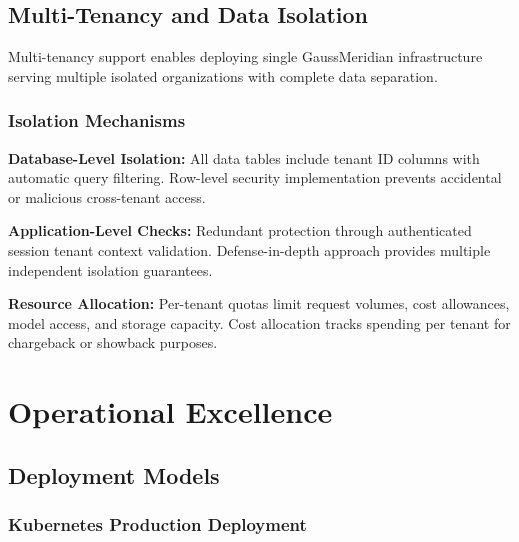 \documentclass[12pt,a4paper,twoside]{report}
\begin{document}
\section{Multi-Tenancy and Data Isolation}

Multi-tenancy support enables deploying single GaussMeridian infrastructure serving multiple isolated organizations with complete data separation.

\subsection{Isolation Mechanisms}

\textbf{Database-Level Isolation:} All data tables include tenant ID columns with automatic query filtering. Row-level security implementation prevents accidental or malicious cross-tenant access.

\textbf{Application-Level Checks:} Redundant protection through authenticated session tenant context validation. Defense-in-depth approach provides multiple independent isolation guarantees.

\textbf{Resource Allocation:} Per-tenant quotas limit request volumes, cost allowances, model access, and storage capacity. Cost allocation tracks spending per tenant for chargeback or showback purposes.


\chapter{Operational Excellence}

\section{Deployment Models}

\subsection{Kubernetes Production Deployment}
\end{document}
